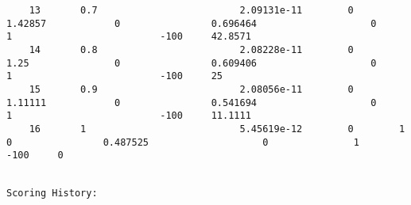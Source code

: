\documentclass[11pt]{article}
\begin{document}
\begin{verbatim}
    13       0.7                         2.09131e-11        0        1.42857            0                0.696464                    0               1                          -100     42.8571
    14       0.8                         2.08228e-11        0        1.25               0                0.609406                    0               1                          -100     25
    15       0.9                         2.08056e-11        0        1.11111            0                0.541694                    0               1                          -100     11.1111
    16       1                           5.45619e-12        0        1                  0                0.487525                    0               1                          -100     0
    \end{verbatim}

    
    \begin{Verbatim}[commandchars=\\\{\}]

Scoring History: 

    \end{Verbatim}
\end{document}
